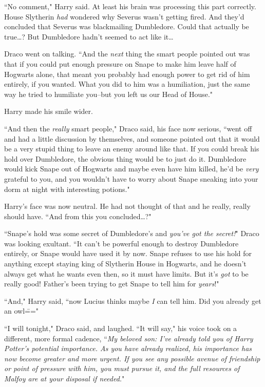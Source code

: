 ``No comment," Harry said. At least his brain was processing this part correctly. House Slytherin \emph{had} wondered why Severus wasn't getting fired. And they'd concluded that Severus was blackmailing Dumbledore. Could that actually be true{\ldots}? But Dumbledore hadn't seemed to act like it{\ldots}

Draco went on talking. ``And the \emph{next} thing the smart people pointed out was that if you could put enough pressure on Snape to make him leave half of Hogwarts alone, that meant you probably had enough power to get rid of him entirely, if you wanted. What you did to him was a humiliation, just the same way he tried to humiliate you\---but you left us our Head of House."

Harry made his smile wider.

``And then the \emph{really} smart people," Draco said, his face now serious, ``went off and had a little discussion by themselves, and someone pointed out that it would be a very stupid thing to leave an enemy around like that. If you could break his hold over Dumbledore, the obvious thing would be to just do it. Dumbledore would kick Snape out of Hogwarts and maybe even have him killed, he'd be \emph{very} grateful to you, and you wouldn't have to worry about Snape sneaking into your dorm at night with interesting potions."

Harry's face was now neutral. He had not thought of that and he really, really should have. ``And from this you concluded{\ldots}?"

``Snape's hold was some secret of Dumbledore's and \emph{you've got the secret!}" Draco was looking exultant. ``It can't be powerful enough to destroy Dumbledore entirely, or Snape would have used it by now. Snape refuses to use his hold for anything except staying king of Slytherin House in Hogwarts, and he doesn't always get what he wants even then, so it must have limits. But it's \emph{got} to be really good! Father's been trying to get Snape to tell him for \emph{years}!"

``And," Harry said, ``now Lucius thinks maybe \emph{I} can tell him. Did you already get an owl\==="

``I will tonight," Draco said, and laughed. ``It will say," his voice took on a different, more formal cadence, ``\emph{My beloved son: I've already told you of Harry Potter's potential importance. As you have already realized, his importance has now become greater and more urgent. If you see any possible avenue of friendship or point of pressure with him, you must pursue it, and the full resources of Malfoy are at your disposal if needed.}"

